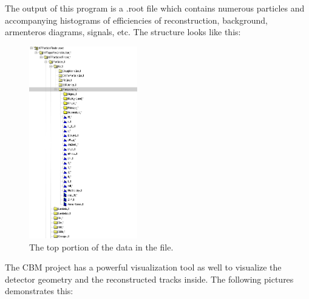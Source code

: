 \documentclass[a4paper,12pt]{article}
\begin{document}
\par The output of this program is a .root file which contains numerous particles and accompanying histograms of efficiencies of reconstruction, background, armenteros diagrams, signals, etc. The structure looks like this:
\begin{figure}[H]
	\centering
	\includegraphics[width=0.42\textwidth]{particle_file.png}
	\caption{ The top portion of the data in the file. }
\end{figure}
\vspace{5mm} 
\par  The CBM project has a powerful visualization tool as well to visualize the detector geometry and the reconstructed tracks inside. The following pictures demonstrates this:
\end{document}
